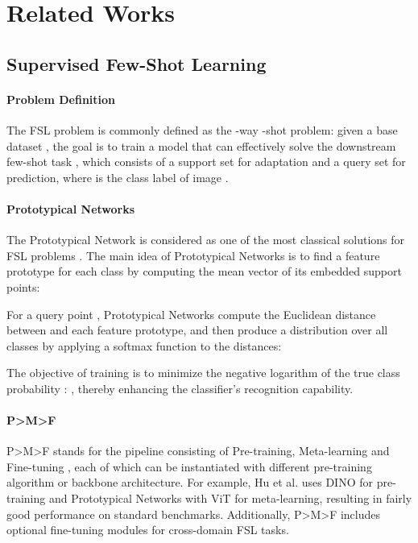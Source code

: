 \documentclass{article}
\begin{document}
\section{Related Works}


\subsection{Supervised Few-Shot Learning}
\label{Supervised Few-Shot Learning}


\paragraph{Problem Definition} The FSL problem is commonly defined as the -way -shot problem: given a base dataset , the goal is to train a model that can effectively solve the downstream few-shot task , which consists of a support set  for adaptation and a query set  for prediction, where  is the class label of image .


\paragraph{Prototypical Networks} The Prototypical Network is considered as one of the most classical solutions for FSL problems \cite{i1}. The main idea of Prototypical Networks is to find a feature prototype for each class by computing the mean vector of its embedded support points:





For a query point , Prototypical Networks compute the Euclidean distance between  and each feature prototype, and then produce a distribution over all classes by applying a softmax function to the distances: 





The objective of training is to minimize the negative logarithm of the true class probability : , thereby enhancing the classifier's recognition capability.


\paragraph{P>M>F} P>M>F stands for the pipeline consisting of Pre-training, Meta-learning and Fine-tuning \cite{i7}, each of which can be instantiated with different pre-training algorithm or backbone architecture. For example, Hu et al. uses DINO \cite{i24} for pre-training and Prototypical Networks with ViT \cite{i29} for meta-learning, resulting in fairly good performance on standard benchmarks. Additionally, P>M>F includes optional fine-tuning modules for cross-domain FSL tasks.
\end{document}
